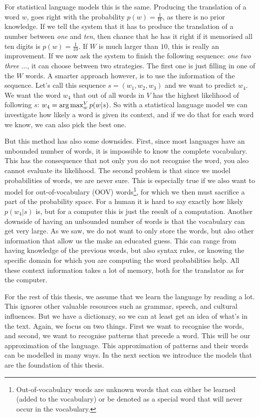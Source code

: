 For statistical language models this is the same. Producing the translation of a word $w$, goes right with the probability $p(w)=\frac{1}{W}$, as there is no prior knowledge. If we tell the system that it has to produce the translation of a number between \emph{one} and \emph{ten}, then chance that he has it right if it memorised all ten digits is $p(w)=\frac{1}{10}$. If $W$ is much larger than $10$, this is really an improvement. If we now ask the system to finish the following sequence: \emph{one} \emph{two} \emph{three} $\ldots$, it can choose between two strategies. The first one is just filling in one of the $W$ words. A smarter approach however, is to use the information of the sequence. Let's call this sequence $s = (w_1, w_2, w_3)$ and we want to predict $w_4$. We want the word $w_4$ that out of all words in $V$ has the highest likelihood of following $s$: $w_4 = \operatorname*{arg\,max}_{w}^{V} p(w|s)$. So with a statistical language model we can investigate how likely a word is given its context, and if we do that for each word we know, we can also pick the best one.

But this method has also some downsides. First, since most languages have an unbounded number of words, it is impossible to know the complete vocabulary. This has the consequence that not only you do not recognise the word, you also cannot evaluate its likelihood. The second problem is that since we model probabilities of words, we are never sure. This is especially true if we also want to model for out-of-vocabulary (OOV) words\footnote{Out-of-vocabulary words are unknown words that can either be learned (added to the vocabulary) or be denoted as a special word that will never occur in the vocabulary.}, for which we then must sacrifice a part of the probability space. For a human it is hard to say exactly how likely $p(w_4|s)$ is, but for a computer this is just the result of a computation. Another downside of having an unbounded number of words is that the vocabulary can get very large. As we saw, we do not want to only store the words, but also other information that allow us the make an educated guess. This can range from having knowledge of the previous words, but also syntax rules, or knowing the specific domain for which you are computing the word probabilities help. All these context information takes a lot of memory, both for the translator as for the computer.

For the rest of this thesis, we assume that we learn the language by reading a lot. This ignores other valuable resources such as grammar, speech, and cultural influences. But we have a dictionary, so we can at least get an idea of what's in the text. Again, we focus on two things. First we want to recognise the words, and second, we want to recognise patterns that precede a word. This will be our approximation of the language. This approximation of patterns and their words can be modelled in many ways. In the next section we introduce the models that are the foundation of this thesis.



